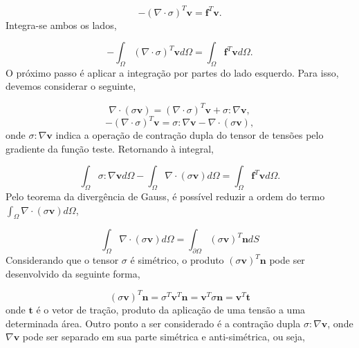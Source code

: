 \begin{equation}
 -(\nabla\cdot\sigma)^T\mathbf{v} = \textbf{f}^T\mathbf{v}.
\end{equation}
Integra-se ambos os lados,
\begin{}

\begin{equation}
 -\int_{\Omega}(\nabla\cdot\sigma)^T\mathbf{v}d\Omega =\int_{\Omega} \textbf{f}^T\mathbf{v}d\Omega.
\end{equation}
O próximo passo é aplicar a integração por partes do lado esquerdo. Para isso, devemos considerar o seguinte,

\begin{equation}
    \nabla\cdot(\sigma\mathbf{v}) = (\nabla\cdot\sigma)^T\mathbf{v} + \sigma:\nabla\mathbf{v},
\end{equation}
\begin{equation}
- (\nabla\cdot\sigma)^T\mathbf{v} =  \sigma:\nabla\mathbf{v}-\nabla\cdot(\sigma\mathbf{v})   ,
\end{equation}
onde $\sigma:\nabla\mathbf{v}$ indica a operação de contração dupla do tensor de tensões pelo gradiente da função teste. Retornando à integral,

\begin{equation}
 \int_{\Omega}  \sigma:\nabla\mathbf{v} d\Omega- \int_{\Omega}\nabla\cdot(\sigma\mathbf{v}) d\Omega =\int_{\Omega} \textbf{f}^T\mathbf{v}d\Omega.
\end{equation}
Pelo teorema da divergência de Gauss, é possível reduzir a ordem do termo $\int_{\Omega}\nabla\cdot(\sigma\mathbf{v}) d\Omega$,

\begin{equation}
    \int_{\Omega}\nabla\cdot(\sigma\mathbf{v})d\Omega= \int_{\partial\Omega}(\sigma\mathbf{v})^T\mathbf{n}dS
\end{equation}
Considerando que o tensor $\sigma$ é simétrico, o produto $(\sigma\mathbf{v})^T\mathbf{n}$ pode ser desenvolvido da seguinte forma,

\begin{equation}
    (\sigma\mathbf{v})^T\mathbf{n} = \sigma^T\mathbf{v}^T\mathbf{n} =  \mathbf{v}^T\sigma\mathbf{n} = \mathbf{v}^T\mathbf{t}
\end{equation}
onde $\mathbf{t}$ é o vetor de tração, produto da aplicação de uma tensão a uma determinada área. Outro ponto a ser considerado é a contração dupla $\sigma:\nabla\mathbf{v}$, onde $\nabla\mathbf{v}$ pode ser separado em sua parte simétrica e anti-simétrica, ou seja,


\end{}
